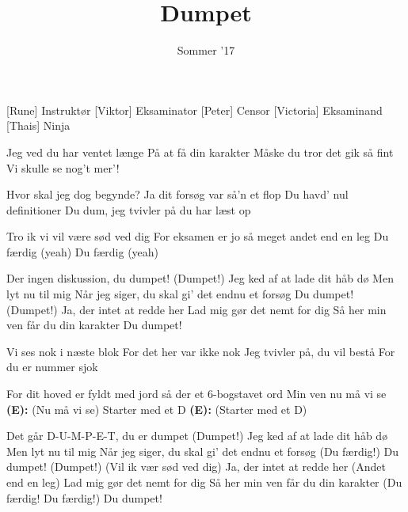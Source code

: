 \documentclass[a4paper,11pt]{article}
\title{Dumpet}
\author{Sommer '17}
\begin{document}
\maketitle

\begin{roles}
[Rune] Instruktør
[Viktor] Eksaminator
[Peter] Censor
[Victoria] Eksaminand
[Thais] Ninja
\end{roles}

\begin{props}
\end{props}


\begin{song}
 Jeg ved du har ventet længe
På at få din karakter
Måske du tror det gik så fint
Vi skulle se nog't mer'!

 Hvor skal jeg dog begynde?
Ja dit forsøg var så'n et flop
Du havd' nul definitioner
 Du dum, jeg tvivler på du har læst op

 Tro ik vi vil være sød ved dig
For eksamen er jo så meget andet end en leg
 Du færdig (yeah)
 Du færdig (yeah)

 Der ingen diskussion, du dumpet! (Dumpet!)
 Jeg ked af at lade dit håb dø
Men lyt nu til mig
Når jeg siger, du skal gi' det endnu et forsøg
 Du dumpet! (Dumpet!)
 Ja, der intet at redde her
Lad mig gør det nemt for dig
Så her min ven får du din karakter
 Du dumpet!

 Vi ses nok i næste blok
For det her var ikke nok
Jeg tvivler på, du vil bestå
For du er nummer sjok

 For dit hoved er fyldt med jord
så der et 6-bogstavet ord
Min ven nu må vi se \textbf{(E):} (Nu må vi se)
Starter med et D \textbf{(E):} (Starter med et D)

 Det går D-U-M-P-E-T, du er dumpet (Dumpet!)
 Jeg ked af at lade dit håb dø
Men lyt nu til mig
Når jeg siger, du skal gi' det endnu et forsøg (Du færdig!)
 Du dumpet! (Dumpet!) (Vil ik vær sød ved dig)
 Ja, der intet at redde her (Andet end en leg)
Lad mig gør det nemt for dig
Så her min ven får du din karakter (Du færdig! Du færdig!)
 Du dumpet!
\end{song}
\end{document}
